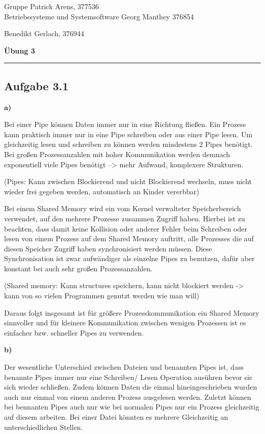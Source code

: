 \documentclass[a4paper,graphics,11pt]{article}
\newcommand{\aufgabe}[1]{\subsection*{Aufgabe #1}}
\begin{document}
\noindent Gruppe              \hfill Patrick Arens, 377536\\
\noindent Betriebssysteme und Systemsoftware    \hfill Georg Manthey 376854\\
\strut\hfill Benedikt Gerlach, 376944\\
\begin{center}
	\LARGE{\textbf{Übung 3}}
\end{center}
\begin{center}
\rule[0.1ex]{\textwidth}{1pt}
\end{center}

\aufgabe{3.1}

\textbf{a)}

Bei einer Pipe können Daten immer nur in eine Richtung fließen. Ein Prozess kann praktisch immer nur in eine Pipe schreiben oder aus einer Pipe lesen. 
Um gleichzeitig lesen und schreiben zu können werden mindestens 2 Pipes benötigt.
Bei großen Prozessanzahlen mit hoher Kommunikation werden demnach exponentiell viele Pipes benötigt --> mehr Aufwand, komplexere Strukturen.

(Pipes: Kann zwischen Blockierend und nicht Blockierend wechseln, muss nicht wieder frei gegeben werden, automatisch an Kinder vererbbar)


Bei einem Shared Memory wird ein vom Kernel verwalteter Speicherbereich verwendet, auf den mehrere Prozesse zusammen Zugriff haben. Hierbei ist zu beachten, dass damit keine Kollision oder anderer Fehler beim Schreiben oder lesen von einem Prozess auf dem Shared Memory auftritt, alle Prozesses die auf diesen Speicher Zugriff haben synchronisiert werden müssen. 
Diese Synchronisation ist zwar aufwändiger als einzelne Pipes zu benutzen, dafür aber konstant bei auch sehr großen Prozessanzahlen.

(Shared memory: Kann structures speichern, kann nicht blockiert werden -> kann von so vielen Programmen genutzt werden wie man will)

Daraus folgt insgesamt ist für größere Prozesskommunikation ein Shared Memory sinnvoller und für kleinere Kommunikation zwischen wenigen Prozessen ist es einfacher bzw. schneller Pipes zu verwenden.




\textbf{b)}

Der wesentliche Unterschied zwischen Dateien und benannten Pipes ist, dass benannte Pipes immer nur eine Schreiben/ Lesen Operation ausühren bevor sie sich wieder schließen. Zudem können Daten die einmal hineingeschrieben wurden auch nur einmal von einem anderen Prozess ausgelesen werden. Zuletzt können bei bennanten Pipes auch nur wie bei normalen Pipes nur ein Prozess gleichzeitig auf diesem arbeiten. Bei einer Datei könnten es mehrere Gleichzeitig an unterschiedlichen Stellen.
\end{document}
